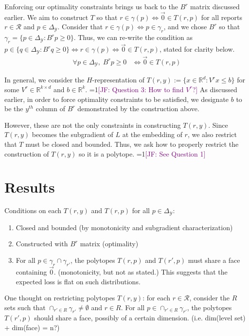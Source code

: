 \documentclass[12pt]{article}
\newcommand{\Comments}{1}
\newcommand{\mynote}[2]{\ifnum\Comments=1\textcolor{#1}{#2}\fi}
\newcommand{\jessie}[1]{\mynote{purple}{[JF: #1]}}
\newcommand{\reals}{\mathbb{R}}
\newcommand{\simplex}{\Delta_\Y}
\newcommand{\R}{\mathcal{R}}
\newcommand{\Y}{\mathcal{Y}}
\begin{document}
Enforcing our optimality constraints brings us back to the $B^r$ matrix discussed earlier.
We aim to construct $T$ so that $r \in \gamma(p) \iff \vec 0 \in T(r,p)$ for all reports $r \in \R$ and $p \in \simplex$.
Consider that $r \in \gamma(p) \iff p \in \gamma_r$, and we chose $B^r$ so that $\gamma_r = \{p \in \simplex : B^rp \geq 0\}$.
Thus, we can re-write the condition as $p \in \{q \in \simplex : B^rq \geq 0\} \iff r \in \gamma(p) \iff \vec 0 \in T(r,p)$, stated for clarity below.
\begin{align*}
\forall p \in \simplex, \; B^r p \geq 0 &\iff \vec 0 \in T(r,p)
\end{align*}

In general, we consider the $H$-representation of $T(r,y) := \{x \in \reals^d : V^r x \leq b\}$ for some $V^r \in \reals^{k \times d}$ and $b \in \reals^k$.
\jessie{Question 3: How to find $V^r$?} 
As discussed earlier, in order to force optimality constraints to be satisfied, we designate $b$ to be the $y^{th}$ column of $B^r$ demonstrated by the construction above.

However, these are not the only constraints in constructing $T(r,y)$.
Since $T(r,y)$ becomes the subgradient of $L$ at the embedding of $r$, we also restrict that $T$ must be closed and bounded.
Thus, we ask how to properly restrict the construction of $T(r,y)$ so it is a polytope. \jessie{See Question 1}


\section*{Results}

Conditions on each $T(r,y)$ and $T(r,p)$ for all $p \in \simplex$:
\begin{enumerate}
	\item Closed and bounded (by monotonicity and subgradient characterization)
	\item Constructed with $B^r$ matrix (optimality)
	\item For all $p \in \gamma_r \cap \gamma_{r'}$, the polytopes $T(r,p)$ and $T(r',p)$ must share a face containing $\vec 0$. (monotonicity, but not as stated.)
	This suggests that the expected loss is flat on such distributions.
\end{enumerate}

One thought on restricting polytopes $T(r,y)$: for each $r \in \R$, consider the $R$ sets such that $\cap_{r' \in R} \gamma_{r'} \neq \emptyset$ and $r \in R$.
For all $p \in \cap_{r' \in R}\gamma_{r'}$, the polytopes $T(r',p)$ should share a face, possibly of a certain dimension.  (i.e. dim(level set) + dim(face) = n?) 
\end{document}
